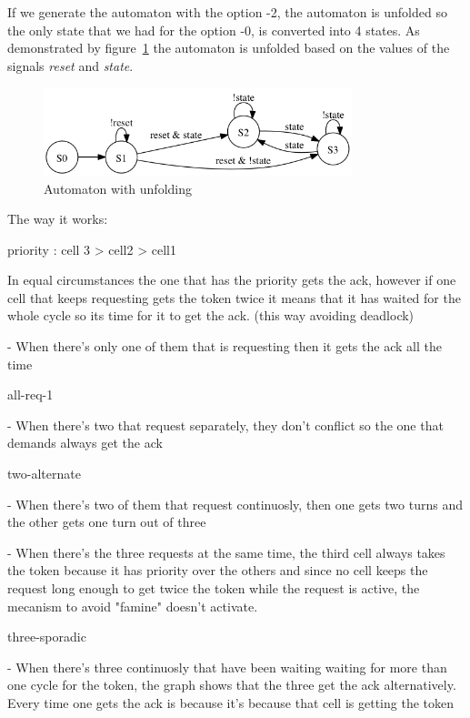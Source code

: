 \documentclass{article}
\begin{document}
If we generate the automaton with the option -2, the automaton
is unfolded so the only state that we had for the option -0, is
converted into 4 states. As demonstrated by figure~\ref{automaton-2}
the automaton is unfolded based on the values of the signals \emph{reset}
and \emph{state}.

\begin{figure}[!ht]
\label{automaton-2}
\caption{Automaton with unfolding}
\begin{center}
\includegraphics[width=0.8\textwidth, natwidth=610,natheight=642]{automaton-2.png}
\end{center}
\end{figure}

The way it works:

priority : cell 3 > cell2 > cell1 

In equal circumstances the one that has the priority gets the ack, however
if one cell that keeps requesting gets the token twice it means that it has waited
for the whole cycle so its time for it to get the ack. (this way avoiding deadlock)

- When there's only one of them that is requesting then it gets the ack all the time

all-req-1

- When there's two that request separately, they don't conflict so the one that
demands always get the ack

two-alternate

- When there's two of them that request continuosly, then one gets two turns and 
the other gets one turn out of three

- When there's the three requests at the same time, the third cell always takes the
token because it has priority over the others and since no cell keeps the request
long enough to get twice the token while the request is active, the mecanism to avoid
"famine" doesn't activate.

three-sporadic

- When there's three continuosly that have been waiting waiting for more than one cycle
for the token, the graph shows that the three get the ack alternatively. Every time 
  one gets the ack is because it's because that cell is getting the token
\end{document}
